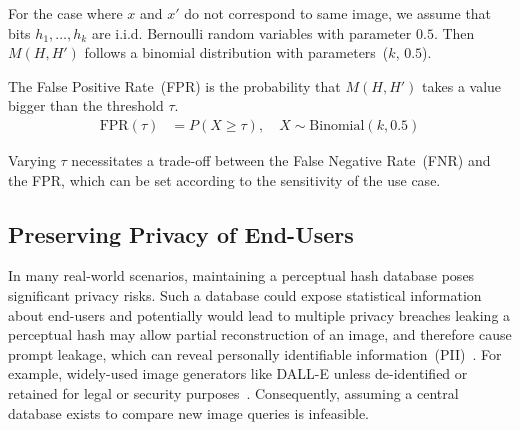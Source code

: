 For the case where $x$ and $x'$ do not correspond to same image, we assume that bits $h_1,\ldots, h_k$ are i.i.d.  Bernoulli random variables with parameter $0.5$. Then $M(H, H')$ follows a binomial distribution with parameters~($k$, $0.5$).

The False Positive Rate~(FPR) is the probability that $M(H, H')$ takes a value bigger than the threshold $\tau$.
\begin{align}
\label{eq:fpr}
\text{FPR}(\tau) &= P(X \geq \tau), \quad X \sim \text{Binomial}(k, 0.5)
\end{align}

Varying $\tau$ necessitates a trade-off between the False Negative Rate~(FNR) and the FPR, which can be set according to the sensitivity of the use case.

\subsection{Preserving Privacy of End-Users}
 In many real-world scenarios, maintaining a perceptual hash database poses significant privacy risks. Such a database could expose statistical information about end-users and potentially would lead to multiple privacy breaches leaking a perceptual hash may allow partial reconstruction of an image, and therefore cause prompt leakage, which can reveal personally identifiable information~(PII)~\cite{perceptual_hash_security_2024}. For example, widely-used image generators like DALL-E  unless de-identified or retained for legal or security purposes~\cite{OpenAIHelp}.  Consequently, assuming a central  database exists to compare new image queries is infeasible.

